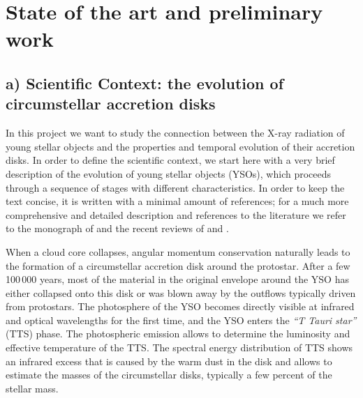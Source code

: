 \documentclass[10pt,fleqn,twoside,a4paper]{article}
\begin{document}
\section{State of the art and preliminary work}
\renewcommand{\leftmark}{\sc State of the Art and preliminary work}


\subsection*{a) Scientific Context: the evolution of circumstellar accretion disks}

In this project we want to study the connection between the X-ray radiation
of young stellar objects and the properties and temporal evolution of their
accretion disks.
%
In order to define the scientific context, we start here with a very brief description
of the evolution of young stellar objects (YSOs), which
proceeds through a sequence of stages with different characteristics.
In order to keep the text concise, it is written with a minimal amount of references;
for a much more comprehensive and detailed description and references to the
literature we refer to the monograph of \citet{Hartmann08} and the recent reviews of
\citet{Alexander14} and \citet{Hartmann16}.
\medskip

When a cloud core collapses, angular momentum conservation
naturally leads to the
formation of a circumstellar accretion disk around the
protostar.
%
After a few 100\,000 years, 
most of the material in the original envelope around the YSO 
has either collapsed
onto this disk or was blown away by the outflows typically driven from
protostars. The photosphere of the YSO becomes directly visible at
infrared and optical wavelengths for the first time, and the YSO
enters the {\em ``T Tauri star''}
(TTS) phase. The photospheric emission allows to
determine the luminosity and effective temperature of the TTS.
The spectral energy distribution of TTS shows an infrared excess that is
caused by the warm dust in the disk and allows
to estimate the  masses of the circumstellar disks,
typically a few percent of the stellar mass.
 
\end{document}
